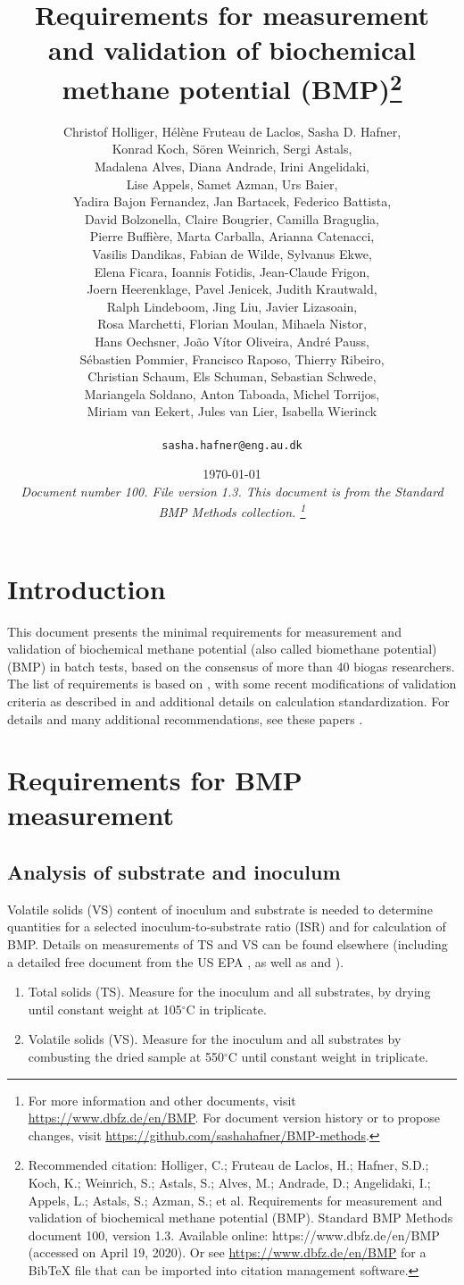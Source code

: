 \documentclass[]{article}
\title {Requirements for measurement and validation of biochemical methane potential (BMP)\footnote{
  Recommended citation: 
Holliger, C.; Fruteau de Laclos, H.; Hafner, S.D.; Koch, K.; Weinrich, S.; Astals, S.; Alves, M.; Andrade, D.; Angelidaki, I.; Appels, L.; Astals, S.; Azman, S.; et al. Requirements for measurement and validation of biochemical methane potential (BMP). Standard BMP Methods document 100, version 1.3. Available online: https://www.dbfz.de/en/BMP (accessed on April 19, 2020).
\newline
  Or see \url{https://www.dbfz.de/en/BMP} for a BibTeX file that can be imported into citation management software.
}}
\author{
Christof Holliger, 
H{\'e}l{\`e}ne Fruteau de Laclos,
Sasha D. Hafner,\\
Konrad Koch,
S{\"o}ren Weinrich,
Sergi Astals, \\
Madalena Alves, 
Diana Andrade,
Irini Angelidaki,\\
Lise Appels,
Samet Azman,
Urs Baier,\\
Yadira Bajon Fernandez,
Jan Bartacek,
Federico Battista,\\
David Bolzonella,
Claire Bougrier,
Camilla Braguglia,\\
Pierre Buffi{\`e}re,
Marta Carballa,
Arianna Catenacci,\\
Vasilis Dandikas,
Fabian de Wilde,
Sylvanus Ekwe,\\
Elena Ficara,
Ioannis Fotidis,
Jean-Claude Frigon, \\
Joern Heerenklage,
Pavel Jenicek,
Judith Krautwald,\\
Ralph Lindeboom,
Jing Liu,
Javier Lizasoain,\\
Rosa Marchetti,
Florian Moulan,
Mihaela Nistor,\\
Hans Oechsner,
Jo{\~a}o V{\'i}tor Oliveira,
Andr{\'e} Pauss,\\
S{\'e}bastien Pommier,
Francisco Raposo,
Thierry Ribeiro,\\
Christian Schaum,
Els Schuman,
Sebastian Schwede,\\
Mariangela Soldano,
Anton Taboada,
Michel Torrijos, \\
Miriam van Eekert,
Jules van Lier,
Isabella Wierinck\\
\\
\texttt{sasha.hafner@eng.au.dk}
}
\date{\today \\
\bigskip
\textit{
  Document number 100.
  File version 1.3. 
  This document is from the Standard BMP Methods collection.
    \footnote{For more information and other documents, visit \url{https://www.dbfz.de/en/BMP}. 
    For document version history or to propose changes, visit \url{https://github.com/sashahafner/BMP-methods}.}
}
}
\begin{document}
\maketitle

\section{Introduction}
This document presents the minimal requirements for measurement and validation of biochemical methane potential (also called biomethane potential) (BMP) in batch tests, based on the consensus of more than 40 biogas researchers.
The list of requirements is based on \citet{holligerStandardizationBiomethanePotential2016}, with some recent modifications of validation criteria as described in \citet{hafnerImprovingInterlaboratoryReproducibilityInpreparation} and additional details on calculation standardization.
For details and many additional recommendations, see these papers \citep{holligerStandardizationBiomethanePotential2016,hafnerImprovingInterlaboratoryReproducibilityInpreparation}.

\section{Requirements for BMP measurement}
\subsection{Analysis of substrate and inoculum}
\label{sec:analysis}
  Volatile solids (VS) content of inoculum and substrate is needed to determine quantities for a selected inoculum-to-substrate ratio (ISR) and for calculation of BMP.
   Details on measurements of TS and VS can be found elsewhere (including a detailed free document from the US EPA \citep{epaMethod1684Total2001}, as well as \citet{strachDeterminationTotalSolids2016} and \citet{bairdStandardMethodsExamination2017}). 

  \begin{enumerate}
    \item Total solids (TS). Measure for the inoculum and all substrates, by drying until constant weight at 105$^\circ$C in triplicate.
    \item Volatile solids (VS). Measure for the inoculum and all substrates by combusting the dried sample at 550$^\circ$C until constant weight in triplicate.
  \end{enumerate}
\end{document}
